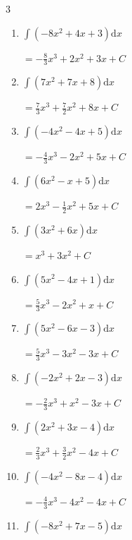 \begin{multicols}{3}
\begin{enumerate}
  \item $\displaystyle \int \left( -8x^{2}+4x+3 \right) \mathrm{d}x$

        $\displaystyle =-\frac{8}{3}x^{3}+2x^{2}+3x+ C$

  \item $\displaystyle \int \left( 7x^{2}+7x+8 \right) \mathrm{d}x$

        $\displaystyle =\frac{7}{3}x^{3}+\frac{7}{2}x^{2}+8x+ C$

  \item $\displaystyle \int \left( -4x^{2}-4x+5 \right) \mathrm{d}x$

        $\displaystyle =-\frac{4}{3}x^{3}-2x^{2}+5x+ C$

  \item $\displaystyle \int \left( 6x^{2}-x+5 \right) \mathrm{d}x$

        $\displaystyle =2x^{3}-\frac{1}{2}x^{2}+5x+ C$

  \item $\displaystyle \int \left( 3x^{2}+6x \right) \mathrm{d}x$

        $\displaystyle =x^{3}+3x^{2}+ C$

\columnbreak %

\resetques

  \item $\displaystyle \int \left( 5x^{2}-4x+1 \right) \mathrm{d}x$

        $\displaystyle =\frac{5}{3}x^{3}-2x^{2}+x+ C$

  \item $\displaystyle \int \left( 5x^{2}-6x-3 \right) \mathrm{d}x$

        $\displaystyle =\frac{5}{3}x^{3}-3x^{2}-3x+ C$

  \item $\displaystyle \int \left( -2x^{2}+2x-3 \right) \mathrm{d}x$

        $\displaystyle =-\frac{2}{3}x^{3}+x^{2}-3x+ C$

  \item $\displaystyle \int \left( 2x^{2}+3x-4 \right) \mathrm{d}x$

        $\displaystyle =\frac{2}{3}x^{3}+\frac{3}{2}x^{2}-4x+ C$

  \item $\displaystyle \int \left( -4x^{2}-8x-4 \right) \mathrm{d}x$

        $\displaystyle =-\frac{4}{3}x^{3}-4x^{2}-4x+ C$

  \item $\displaystyle \int \left( -8x^{2}+7x-5 \right) \mathrm{d}x$


\end{enumerate}
\end{multicols}
